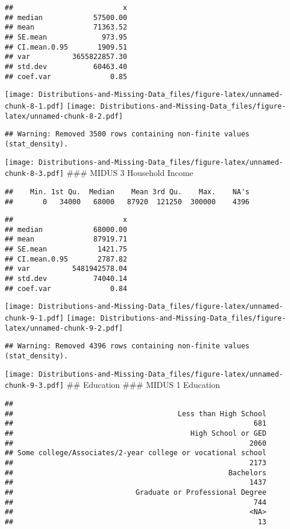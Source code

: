 \documentclass[
]{article}
\begin{document}
\begin{verbatim}
##                          x
## median            57500.00
## mean              71363.52
## SE.mean             973.95
## CI.mean.0.95       1909.51
## var          3655822857.30
## std.dev           60463.40
## coef.var              0.85
\end{verbatim}

\texttt{[image: Distributions-and-Missing-Data\_files/figure-latex/unnamed-chunk-8-1.pdf]}
\texttt{[image: Distributions-and-Missing-Data\_files/figure-latex/unnamed-chunk-8-2.pdf]}

\begin{verbatim}
## Warning: Removed 3500 rows containing non-finite values (stat_density).
\end{verbatim}

\texttt{[image: Distributions-and-Missing-Data\_files/figure-latex/unnamed-chunk-8-3.pdf]}
\#\#\# MIDUS 3 Household Income

\begin{verbatim}
##    Min. 1st Qu.  Median    Mean 3rd Qu.    Max.    NA's 
##       0   34000   68000   87920  121250  300000    4396
\end{verbatim}

\begin{verbatim}
##                          x
## median            68000.00
## mean              87919.71
## SE.mean            1421.75
## CI.mean.0.95       2787.82
## var          5481942578.04
## std.dev           74040.14
## coef.var              0.84
\end{verbatim}

\texttt{[image: Distributions-and-Missing-Data\_files/figure-latex/unnamed-chunk-9-1.pdf]}
\texttt{[image: Distributions-and-Missing-Data\_files/figure-latex/unnamed-chunk-9-2.pdf]}

\begin{verbatim}
## Warning: Removed 4396 rows containing non-finite values (stat_density).
\end{verbatim}

\texttt{[image: Distributions-and-Missing-Data\_files/figure-latex/unnamed-chunk-9-3.pdf]}
\#\# Education \#\#\# MIDUS 1 Education

\begin{verbatim}
## 
##                                       Less than High School 
##                                                         681 
##                                          High School or GED 
##                                                        2060 
## Some college/Associates/2-year college or vocational school 
##                                                        2173 
##                                                   Bachelors 
##                                                        1437 
##                             Graduate or Professional Degree 
##                                                         744 
##                                                        <NA> 
##                                                          13
\end{verbatim}
\end{document}
